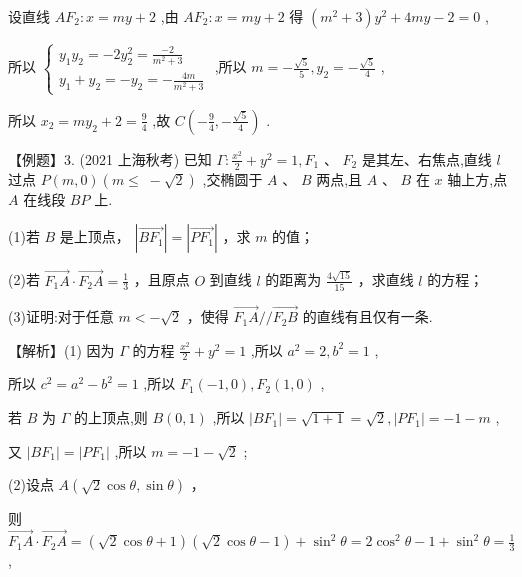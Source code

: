 \documentclass[10pt]{article}
\begin{document}
设直线 \(A{F}_{2} : x = {my} + 2\) ,由 \(A{F}_{2} : x = {my} + 2\) 得 \(\left( {{m}^{2} + 3}\right) {y}^{2} + {4my} - 2 = 0\) ,

所以 \(\left\{  \begin{array}{l} {y}_{1}{y}_{2} =  - 2{y}_{2}^{2} = \frac{-2}{{m}^{2} + 3} \\  {y}_{1} + {y}_{2} =  - {y}_{2} =  - \frac{4m}{{m}^{2} + 3} \end{array}\right.\) ,所以 \(m =  - \frac{\sqrt{5}}{5},{y}_{2} =  - \frac{\sqrt{5}}{4}\) ,

所以 \({x}_{2} = m{y}_{2} + 2 = \frac{9}{4}\) ,故 \(C\left( {-\frac{9}{4}, - \frac{\sqrt{5}}{4}}\right)\) .

【例题】3. (2021 上海秋考) 已知 \(\Gamma  : \frac{{x}^{2}}{2} + {y}^{2} = 1,{F}_{1}\text{ 、 }{F}_{2}\) 是其左、右焦点,直线 \(l\) 过点 \(P\left( {m,0}\right) (m \leq \; - \sqrt{2})\) ,交椭圆于 \(A\text{ 、 }B\) 两点,且 \(A\text{ 、 }B\) 在 \(x\) 轴上方,点 \(A\) 在线段 \({BP}\) 上.

(1)若 \(B\) 是上顶点， \(\left| \overrightarrow{B{F}_{1}}\right|  = \left| \overrightarrow{P{F}_{1}}\right|\) ，求 \(m\) 的值；

(2)若 \(\overrightarrow{{F}_{1}A} \cdot  \overrightarrow{{F}_{2}A} = \frac{1}{3}\) ，且原点 \(O\) 到直线 \(l\) 的距离为 \(\frac{4\sqrt{15}}{15}\) ，求直线 \(l\) 的方程；

(3)证明:对于任意 \(m <  - \sqrt{2}\) ，使得 \(\overrightarrow{{F}_{1}A}//\overrightarrow{{F}_{2}B}\) 的直线有且仅有一条.

【解析】(1) 因为 \(\Gamma\) 的方程 \(\frac{{x}^{2}}{2} + {y}^{2} = 1\) ,所以 \({a}^{2} = 2,{b}^{2} = 1\) ,

所以 \({c}^{2} = {a}^{2} - {b}^{2} = 1\) ,所以 \({F}_{1}\left( {-1,0}\right) ,{F}_{2}\left( {1,0}\right)\) ,

若 \(B\) 为 \(\Gamma\) 的上顶点,则 \(B\left( {0,1}\right)\) ,所以 \(\left| {B{F}_{1}}\right|  = \sqrt{1 + 1} = \sqrt{2},\left| {P{F}_{1}}\right|  =  - 1 - m\) ,

又 \(\left| {B{F}_{1}}\right|  = \left| {P{F}_{1}}\right|\) ,所以 \(m =  - 1 - \sqrt{2}\) ;

(2)设点 \(A\left( {\sqrt{2}\cos \theta ,\sin \theta }\right)\) ，

则 \(\overrightarrow{{F}_{1}A} \cdot  \overrightarrow{{F}_{2}A} = \left( {\sqrt{2}\cos \theta  + 1}\right) \left( {\sqrt{2}\cos \theta  - 1}\right)  + {\sin }^{2}\theta  = 2{\cos }^{2}\theta  - 1 + {\sin }^{2}\theta  = \frac{1}{3}\) ,
\end{document}
